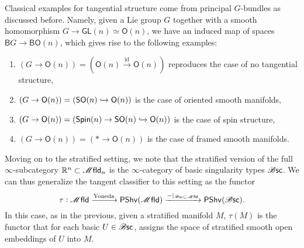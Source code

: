 \documentclass[../text]{subfiles}
\begin{document}
\begin{example}
    Classical examples for tangential structure come from principal $G$-bundles as discussed before. Namely, given a Lie group $G$ together with a smooth homomorphism $G \rightarrow \mathsf{GL}(n) \simeq \mathsf{O}(n)$, we have an induced map of spaces $\mathsf{B}G \rightarrow \mathsf{BO}(n)$, which gives rise to the following examples:
    \begin{enumerate}
        \item $(G \rightarrow \mathsf{O}(n)) = (\mathsf{O}(n) \xrightarrow{\mathrm{id}} \mathsf{O}(n))$ reproduces the case of no tangential structure,
        \item $(G \rightarrow \mathsf{O}(n)) = (\mathsf{SO}(n) \xhookrightarrow{} \mathsf{O}(n))$ is the case of oriented smooth manifolds,
        \item $(G \rightarrow \mathsf{O}(n)) = (\mathsf{Spin}(n) \rightarrow \mathsf{SO}(n) \xhookrightarrow{} \mathsf{O}(n))$ is the case of spin structure,
        \item $(G \rightarrow \mathsf{O}(n)) = (* \rightarrow \mathsf{O}(n))$ is the case of framed smooth manifolds.
    \end{enumerate}
\end{example}

Moving on to the stratified setting, we note that the stratified version of the full $\infty$-subcategory $\mathbb{R}^n \subset \mfld_n$ is the $\infty$-category of basic singularity types $\mathscr{B} \mathsf{sc}$. We can thus generalize the tangent classifier to this setting as the functor
%
\begin{equation}
    \tau: \mfld \xrightarrow{\mathrm{Yoneda}} \mathsf{PShv}(\mfld) \xrightarrow{-|_{\bsc \subset \mfld}} \mathsf{PShv}(\bsc).
\end{equation}
%
In this case, as in the previous, given a stratified manifold $M$, $\tau(M)$ is the functor that for each basic $U \in \mathscr{B} \mathsf{sc}$, assigns the space of stratified smooth open embeddings of $U$ into $M$.
\end{document}
